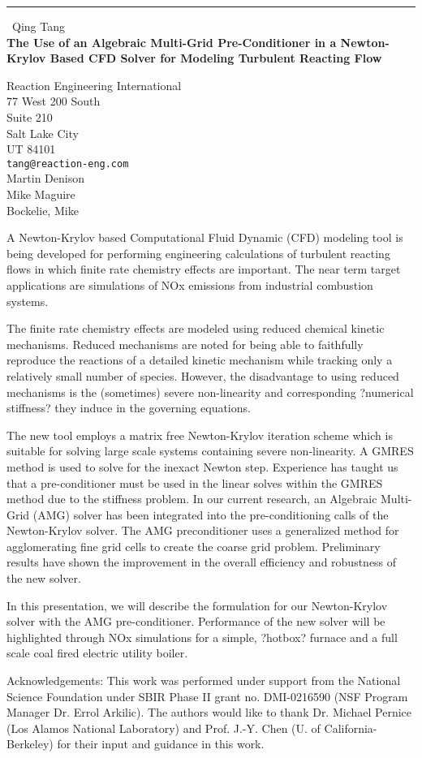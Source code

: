 \documentclass{report}
\begin{document}
\begin{center}
\rule{6in}{1pt} \
{\large Qing Tang \\
{\bf The Use of an Algebraic Multi-Grid Pre-Conditioner in a Newton-Krylov Based CFD Solver for Modeling Turbulent Reacting Flow}}

Reaction Engineering International \\ 77 West 200 South \\ Suite 210 \\ Salt Lake City \\ UT 84101
\\
{\tt tang@reaction-eng.com}\\
Martin Denison\\
Mike Maguire\\
	Bockelie, Mike\end{center}

A Newton-Krylov based Computational Fluid Dynamic (CFD) modeling tool is
being developed for performing engineering calculations of turbulent
reacting flows in which finite rate chemistry effects are important. The
near term target applications are simulations of NOx emissions from
industrial combustion systems.

The finite rate chemistry effects are modeled using reduced chemical
kinetic mechanisms. Reduced mechanisms are noted for being able to
faithfully reproduce the reactions of a detailed kinetic mechanism while
tracking only a relatively small number of species. However, the
disadvantage to using reduced mechanisms is the (sometimes) severe
non-linearity and corresponding ?numerical stiffness? they induce in the
governing equations.

The new tool employs a matrix free Newton-Krylov iteration scheme which
is suitable for solving large scale systems containing severe
non-linearity. A GMRES method is used to solve for the inexact Newton
step. Experience has taught us that a pre-conditioner must be used in the
linear solves within the GMRES method due to the stiffness problem. In
our current research, an Algebraic Multi-Grid (AMG) solver has been
integrated into the pre-conditioning calls of the Newton-Krylov solver.
The AMG preconditioner uses a generalized method for agglomerating fine
grid cells to create the coarse grid problem. Preliminary results have
shown the improvement in the overall efficiency and robustness of the new
solver.

In this presentation, we will describe the formulation for our
Newton-Krylov solver with the AMG pre-conditioner. Performance of the new
solver will be highlighted through NOx simulations for a simple, ?hotbox?
furnace and a full scale coal fired electric utility boiler.

Acknowledgements:
This work was performed under support from the National Science
Foundation under SBIR Phase II grant no. DMI-0216590 (NSF Program Manager
Dr. Errol Arkilic). The authors would like to thank Dr. Michael Pernice
(Los Alamos National Laboratory) and Prof. J.-Y. Chen (U. of
California-Berkeley) for their input and guidance in this work.
\end{document}
